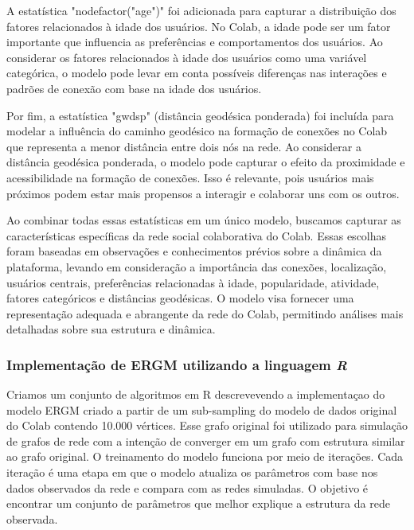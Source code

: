 A estatística "nodefactor("age")" foi adicionada para capturar a distribuição dos fatores relacionados à idade dos usuários. No Colab, a idade pode ser um fator importante que influencia as preferências e comportamentos dos usuários. Ao considerar os fatores relacionados à idade dos usuários como uma variável categórica, o modelo pode levar em conta possíveis diferenças nas interações e padrões de conexão com base na idade dos usuários.

Por fim, a estatística "gwdsp" (distância geodésica ponderada) foi incluída para modelar a influência do caminho geodésico na formação de conexões no Colab que representa a menor distância entre dois nós na rede. Ao considerar a distância geodésica ponderada, o modelo pode capturar o efeito da proximidade e acessibilidade na formação de conexões. Isso é relevante, pois usuários mais próximos podem estar mais propensos a interagir e colaborar uns com os outros.

Ao combinar todas essas estatísticas em um único modelo, buscamos capturar as características específicas da rede social colaborativa do Colab. Essas escolhas foram baseadas em observações e conhecimentos prévios sobre a dinâmica da plataforma, levando em consideração a importância das conexões, localização, usuários centrais, preferências relacionadas à idade, popularidade, atividade, fatores categóricos e distâncias geodésicas. O modelo visa fornecer uma representação adequada e abrangente da rede do Colab, permitindo análises mais detalhadas sobre sua estrutura e dinâmica.

\subsubsection*{Implementação de ERGM utilizando a linguagem \textit{R}}

Criamos um conjunto de algoritmos em R descrevevendo a implementaçao do modelo ERGM criado a partir de um sub-sampling do modelo de dados original do Colab contendo 10.000 vértices. Esse grafo original foi utilizado para simulação de grafos de rede com a intenção de converger em um grafo com estrutura similar ao grafo original. O treinamento do modelo funciona por meio de iterações. Cada iteração é uma etapa em que o modelo atualiza os parâmetros com base nos dados observados da rede e compara com as redes simuladas. O objetivo é encontrar um conjunto de parâmetros que melhor explique a estrutura da rede observada.


